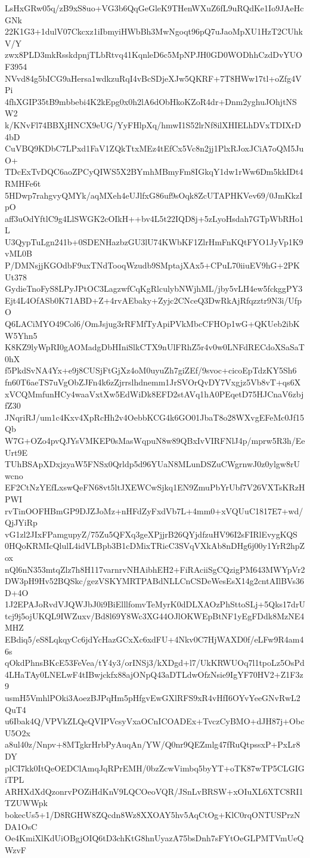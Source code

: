 LsHxGRw05q/zB9xS8uo+VG3b6QqGeGleK9THenWXuZ6fL9uRQdKe1Io9JAeHcGNk
22K1G3+1dulV07Ckcxz1iIbmyiHWbBh3MwNgoqt96pQ7uJaoMpXU1HzT2CUhkV/Y
zwx8PLD3mkRsskdpnjTLbRtvq41KqnleD6c5MpNPJH0GD0WODhhCzdDvYUOF3954
NVvd84g5bICG9aHersa1wdkzuRqI4vBcSDjeXJw5QKRF+7T8HWw17tl+oZfg4VPi
4fhXGIP35tB9mbbebi4K2kEpg0x0h2lA6dObHkoKZoR4dr+Dnm2yghuJOhjtNSW2
k/KNvFl74BBXjHNCX9eUG/YyFHlpXq/hmwI1S52lrNf8ilXHIELhDVxTDIXrD4bD
CuVBQ9KDbC7LPxd1FaV1ZQkTtxMEz4tEfCx5Vc8n2jj1PlxRJoxJCiA7oQM5JuO+
TDcExTvDQC6aoZPCyQIWS5X2BYmhMBmyFm8IGkqY1dw1rWw6Dm5kkIDt4RMHFe6t
5HDwp7rahgvyQMYk/aqMXeh4eUJlfxG86uf9sOqk8ZcUTAPHKVev69/0JmKkzIpO
aff3uOdYftlC9g4LlSWGK2cOIkH++bv4L5t22IQD8j+5zLyoHsdah7GTpWbRHo1L
U3QypTuLgn241b+0SDENHazbzGU3lU74KWbKF1ZlrHmFnKQtFYO1JyVp1K9vML0B
P/DMNsjjKGOdbF9uxTNdTooqWzudb9SMptajXAx5+CPuL70iiuEV9hG+2PKUt378
GydieTnoFyS8LPyJPtOC3LagzwfCqKgRlculybNWjhML/jby5vLH4ew5fckggPY3
Ejt4L4OfASb0K71ABD+Z+4rvAEbaky+Zyjc2CNceQ3DwRkAjRfqzztr9N3i/UfpO
Q6LACiMYO49Col6/OmJsjug3rRFMfTyApiPVkMbcCFHOp1wG+QKUeb2ibKW5Yhn5
K8KZ9lyWpRI0gAOMadgDbHIniSlkCTX9nUlFRhZ5r4v0w0LNFdRECdoXSaSaT0hX
f5PkdSvNA4Yx+e9j8CUSjFtGjXz4oM0uyuZh7giZEf/9svoc+cicoEpTdzKY5Sh6
fn60T6aeTS7uVgObZJFn4k6zZjrrslhdnemm1JrSVOrQvDY7Vxgjz5Vb8vT+qs6X
xVCQMmfunHCy4waaVxtXw5EdWiDk8EFD2stAVq1hA0PEqetD75HJCnaV6zbjfZ30
JNqriRJ/um1c4Kxv4XpRcHh2v4OebbKCG4k6GO01JbaT8o28WXvgEFeMc0Jf15Qb
W7G+OZo4pvQJYsVMKEP0sMasWqpuN8w89QBxIvVIRFNlJ4p/mprw5R3h/EeUrt9E
TUhBSApXDxjzyaW5FNSx0Qrldp5d96YUaN8MLunDSZuCWgrnwJ0z0ylgw8rUwcno
EF2CtNzYEfLxswQeFN68vt5ltJXEWCwSjkq1EN9ZmuPbYrUbf7V26VXTsKRzHPWI
rvTinOOFHBmGP9DJZJoMz+nHFdZyFxdVb7L+4mm0+xVQUuC1817E7+wd/QjJYiRp
vG1zl2JIxFPamgupyZ/75Zu5QFXq3geXPjjrB26QYjdfzuHV96I2sFIRlEvygKQS
0HQoKRMIcQlulL4idVLBpb3B1cDMixTRicC3SVqVXkAb8nDHg6j00y1YrR2hpZox
nQl6nN353mtqZlz7h8H117varnrvNHAibhEH2+FiRAciiSgCQzigPM643MWYpVr2
DW3pH9Hv52BQSkc/gezVSKYMRTPABdNLLCnCSDeWesEsX14g2cntAIlBVs36D+4O
1J2EPAJoRvdVJQWJbJ0i9BiElllfomvTeMyrK0dDLXAOzPhSttoSLj+5Qks17drU
tcj9j5ojUKQL9IWZuxv/Bd8l69Y8Wc3XG44OJlOKWEpBtNF1yEgFDdk8MzNE4MHZ
EBdiq5/eS8LqkqyCc6jdYcHazGCxXc6xdFU+4Nkv0C7HjWAXD0f/eLFw9R4am46s
qOkdPhnsBKcE53FeVea/tY4y3/orINSj3/kXDgd+l7/UkKRWUOq7l1tpoLz5OsPd
4LHaTAy0LNELwF4tIBwjckfx88ajONpQ43aDTLdwOfzNsie9IgYF70HV2+Z1F3z9
usmH5VmhlPOki3AoezBJPqHm5pHfgvEwGXlRFS9xR4vHfI6OYvYeeGNvRwL2QuT4
u6Ibak4Q/VPVkZLQeQVIPVcsyVxaOCnICOADEx+TvczCyBMO+dJH87j+ObcU5O2x
a8ul40z/Nnpv+8MTgkrHrbPyAuqAn/YW/Q0nr9QEZmlg47fRuQtpssxP+PxLr8DY
plCI7kk0ItQeOEDClAmqJqRPrEMH/0bzZcwVimbq5byYT+oTK87wTP5CLGIGiTPL
ARHXdXdQzonrvPOZiHdKnV9LQCOeoVQR/JSnLvBRSW+xOIuXL6XTC8RI1TZUWWpk
bokecUs5+1/D8RGHW8ZQcdn8Wz8XXOAY5hv5AqCtOg+KlC0rqONTUSPrzNDA1OsC
Oe4KmiXlKdUiOBgjOIQ6tD3chKtG8hnUyazA75bsDnh7sFYtOeGLPMTVmUeQWzvF
